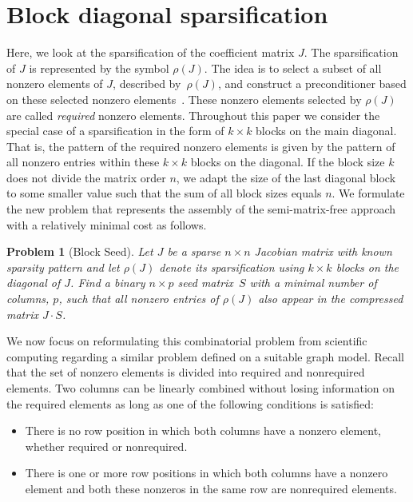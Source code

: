 \documentclass[12pt, twoside,a4paper,toc=bibliography]{scrbook}
\newtheorem{problem}{Problem}
\newcommand{\sparsifysymbol}{\ensuremath{\rho}}
\newcommand{\sparsify}[1]{\ensuremath{\sparsifysymbol(#1)}}
\begin{document}
\section{Block diagonal sparsification}
\label{s.block.diag.sp}
Here, we look at the sparsification of the coefficient matrix $J$. The
sparsification of $J$ is represented by the symbol \sparsify{J}. The idea is to select a
subset of all nonzero elements of $J$, described by~\sparsify{J}, and construct a
preconditioner based on these selected nonzero elements~\cite{Cullum2006}. These nonzero
elements selected by \sparsify{J} are called \emph{required} nonzero elements. Throughout
this paper we consider the special case of a sparsification in the form of $k\times k$
blocks on the main diagonal. That is, the pattern of the required nonzero elements is
given by the pattern of all nonzero entries within these $k\times k$ blocks on the
diagonal. If the block size $k$ does not divide the matrix order $n$, we adapt the size
of the last diagonal block to some smaller value such that the sum of all block sizes
equals $n$. We formulate the new problem that represents the assembly of the
semi-matrix-free approach with a relatively minimal cost as follows.
%
\begin{problem}[Block Seed]
\label{p:block}
%
Let $J$ be a sparse $n \times n$ Jacobian matrix with known sparsity pattern and let
\sparsify{J} denote its sparsification using $k \times k$ blocks on the diagonal of $J$.
Find a binary $n \times p$ seed matrix~$S$ with a minimal number of columns, $p$, such
that all nonzero entries of \sparsify{J} also appear in the compressed matrix $J \cdot
S$.
\end{problem}

We now focus on reformulating this combinatorial problem from
scientific computing regarding a similar problem defined on a suitable graph model.
Recall that the set of nonzero elements is divided into required and nonrequired
elements. Two columns can be linearly combined without losing information on the
required elements as long as one of the following conditions is satisfied:
\begin{itemize}
\item There is no row position in which both columns have a nonzero element, whether
required or nonrequired.
\item There is one or more row positions in which both columns have a nonzero element
and both these nonzeros in the same row are nonrequired elements.
\end{itemize}
\end{document}
